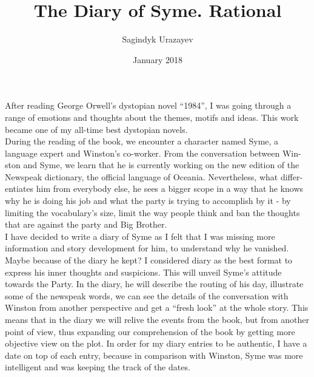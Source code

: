 \documentclass{article}
\title{The Diary of Syme. Rational}
\author{Sagindyk Urazayev}
\date{January 2018}
\begin{document}
\maketitle
\newpage

After reading George Orwell’s dystopian novel “1984”, I was going through a range of emotions and thoughts about the themes, motifs and ideas. This work became one of my all-time best dystopian novels.\\

During the reading of the book, we encounter a character named Syme, a language expert and Winston’s co-worker. From the conversation between Win- ston and Syme, we learn that he is currently working on the new edition of the Newspeak dictionary, the official language of Oceania. Nevertheless, what differ- entiates him from everybody else, he sees a bigger scope in a way that he knows why he is doing his job and what the party is trying to accomplish by it - by limiting the vocabulary’s size, limit the way people think and ban the thoughts that are against the party and Big Brother. \\


I have decided to write a diary of Syme as I felt that I was missing more information and story development for him, to understand why he vanished. Maybe because of the diary he kept? I considered diary as the best format to express his inner thoughts and suspicions. This will unveil Syme’s attitude towards the Party. In the diary, he will describe the routing of his day, illustrate some of the newspeak words, we can see the details of the conversation with Winston from another perspective and get a “fresh look” at the whole story. This means that in the diary we will relive the events from the book, but from another point of view, thus expanding our comprehension of the book by getting more objective view on the plot. In order for my diary entries to be authentic, I have a date on top of each entry, because in comparison with Winston, Syme was more intelligent and was keeping the track of the dates.\\
\end{document}
